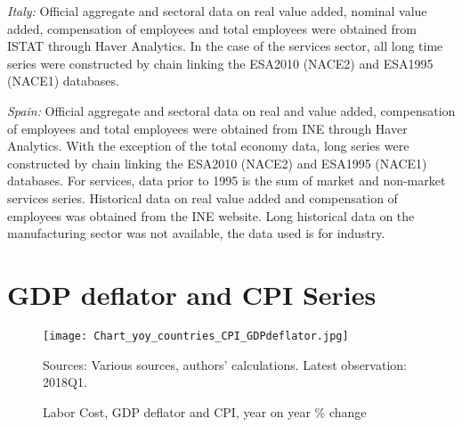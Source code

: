 \documentclass[11pt]{article}
\begin{document}
\begin{appendices}
\textit{Italy:} Official aggregate and sectoral data on real value added, nominal value added, compensation of employees and total employees were obtained from ISTAT through Haver Analytics. In the case of the services sector, all long time series were constructed by chain linking the ESA2010 (NACE2) and ESA1995 (NACE1) databases. 

\textit{Spain:} Official aggregate and sectoral data on real and value added, compensation of employees and total employees were obtained from INE through Haver Analytics. With the exception of the total economy data, long series were constructed by chain linking the ESA2010 (NACE2) and ESA1995 (NACE1) databases. For services, data prior to 1995 is the sum of market and non-market services series. Historical data on real value added and compensation of employees was obtained from the INE website. Long historical data on the manufacturing sector was not available, the data used is for industry.

\clearpage


\section{GDP deflator and CPI Series}
\label{AppendixCPI}

\begin{figure}[!htbp]
\begin{center}
\caption{Labor Cost, GDP deflator and CPI, year on year \% change}\label{fig:Figure_yoycountries_CPI}
\texttt{[image: Chart\_yoy\_countries\_CPI\_GDPdeflator.jpg]}
\begin{minipage}{\textwidth} {\footnotesize
Sources: Various sources, authors' calculations.
Latest observation: 2018Q1.\par}
\end{minipage}
\end{center}
\end{figure}

\clearpage





\end{appendices}
\end{document}
